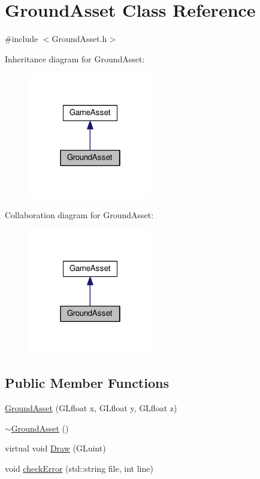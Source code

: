 \hypertarget{classGroundAsset}{}\section{Ground\+Asset Class Reference}
\label{classGroundAsset}


{\ttfamily \#include $<$Ground\+Asset.\+h$>$}



Inheritance diagram for Ground\+Asset\+:\nopagebreak
\begin{figure}[H]
\begin{center}
\leavevmode
\includegraphics[width=154pt]{classGroundAsset__inherit__graph}
\end{center}
\end{figure}


Collaboration diagram for Ground\+Asset\+:\nopagebreak
\begin{figure}[H]
\begin{center}
\leavevmode
\includegraphics[width=154pt]{classGroundAsset__coll__graph}
\end{center}
\end{figure}
\subsection*{Public Member Functions}
\begin{DoxyCompactItemize}
\item 
\hyperlink{classGroundAsset_a4b927d07732cb30f8d5b35047bc2de22}{Ground\+Asset} (G\+Lfloat x, G\+Lfloat y, G\+Lfloat z)
\item 
\hyperlink{classGroundAsset_a8f607f3cabded6280c5a5eb2cbfa8c79}{$\sim$\+Ground\+Asset} ()
\item 
virtual void \hyperlink{classGroundAsset_a440f983638c7a7ccb6a39718444dfe95}{Draw} (G\+Luint)
\item 
void \hyperlink{classGroundAsset_a4fad6edd0d2f5aee6acc9a5a872aea96}{check\+Error} (std\+::string file, int line)
\end{DoxyCompactItemize}



